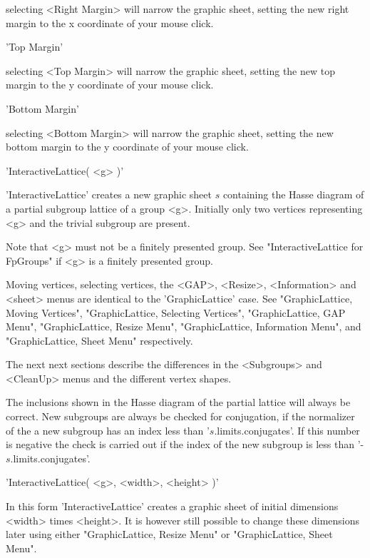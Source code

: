selecting <Right  Margin> will narrow the graphic  sheet, setting the new
right margin to the x coordinate of your mouse click.

'Top Margin'

selecting <Top Margin> will narrow the graphic sheet, setting the new top
margin to the y coordinate of your mouse click.

'Bottom Margin'

selecting <Bottom Margin> will narrow the graphic  sheet, setting the new
bottom margin to the y coordinate of your mouse click.


'InteractiveLattice( <g> )'

'InteractiveLattice' creates a new graphic sheet $s$ containing the Hasse
diagram of a partial subgroup lattice of a group <g>.  Initially only two
vertices representing <g> and the trivial subgroup are present.

Note that    <g>  must  not   be a    finitely  presented  group.     See
"InteractiveLattice for FpGroups" if <g> is a finitely presented group.

Moving  vertices, selecting vertices,  the <GAP>, <Resize>, <Information>
and <sheet> menus   are  identical to  the  'GraphicLattice'  case.   See
"GraphicLattice,  Moving Vertices", "GraphicLattice, Selecting Vertices",
"GraphicLattice,    GAP       Menu",    "GraphicLattice,  Resize   Menu",
"GraphicLattice,  Information Menu",  and  "GraphicLattice,  Sheet  Menu"
respectively.

The next  next sections describe the  differences in  the <Subgroups> and
<CleanUp> menus and the different vertex shapes.

The inclusions shown  in the Hasse  diagram of  the  partial lattice will
always be correct.  New subgroups are always  be checked for conjugation,
if  the  normalizer  of   the a  new   subgroup  has an index   less than
'$s$.limits.conjugates'.  If this number is negative the check is carried
out     if   the     index of   the       new  subgroup   is   less  than
'-$s$.limits.conjugates'.

'InteractiveLattice( <g>, <width>, <height> )'

In  this  form 'InteractiveLattice' creates   a  graphic sheet of initial
dimensions <width>  times <height>.   It   is however still possible   to
change these dimensions  later using either "GraphicLattice, Resize Menu"
or "GraphicLattice, Sheet Menu".

